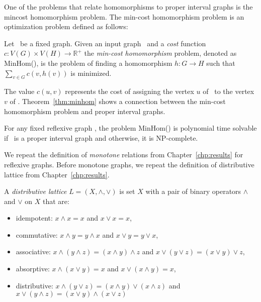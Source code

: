 One of the problems that relate homomorphisms to proper interval graphs is the mincost homomorphism problem.
The min-cost homomorphism problem is an optimization problem defined as follows:

\begin{defi} [MinHom]
Let \mH\ be a fixed graph. Given an input graph \mG\ and a \emph{cost} function
\(c: V(G) \times V(H) \to \mathbb{R}^+\) the \emph{min-cost homomorphism} problem,
denoted as MinHom(\mH), is the problem of finding a homomorphism 
\(h:G\to H\) such that \(\sum_{v\in G} c(v, h(v))\) is minimized.
\end{defi}

The value \(c(u,v)\) represents the cost of assigning the vertex \(u\) of \mG\ to the vertex \(v\) of \mH\@.
Theorem~\ref{thm:minhom} shows a connection between the min-cost homomorphism problem 
and proper interval graphs.

\begin{theorem}  \label{thm:minhom}
For any fixed reflexive graph \mH, the problem MinHom(\mH) is polynomial time solvable if
\mH\ is a proper interval graph and otherwise, it is NP-complete.
\end{theorem}

We repeat the definition of \emph{monotone} relations from Chapter~\ref{chp:results}
for reflexive graphs. Before monotone graphs, we repeat the definition of distributive lattice from Chapter~\ref{chp:results}\@.

\begin{defi} 
A \emph{distributive lattice} \(L=(X,\wedge,\vee)\) is set \(X\) with a pair of binary operators \(\wedge\)
and \(\vee\) on \(X\) that are:
\begin{itemize}
\item idempotent: \(x \wedge x = x\) and \(x \vee x = x\),
\item commutative: \(x \wedge y = y \wedge x\) and \(x \vee y = y \vee x\),
\item associative: \(x \wedge (y \wedge z) = (x \wedge y) \wedge z\) and 
\(x \vee (y \vee z) = (x \vee y) \vee z\),
\item absorptive: \(x \wedge (x\vee y) = x\) and \(x \vee (x \wedge y) = x\),
\item distributive: \(x \wedge (y \vee z) = (x \wedge y) \vee (x \wedge z)\) and
\(x \vee (y \wedge z) = (x \vee y) \wedge (x \vee z)\)
\end{itemize}
\end{defi}

